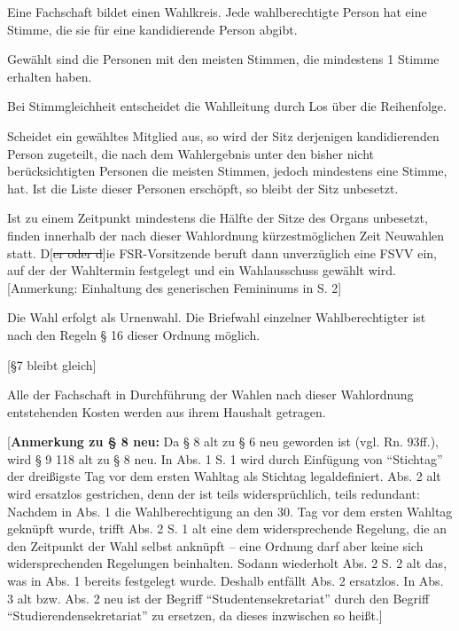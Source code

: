 \documentclass[%
draft,%
multilinesections%
]{fswo}
\newcommand\oldT[1] {{\color{Gray}[\st{#1}]}}
\newcommand\bemFr[1]{{\color{Red}[#1]}}
\newcommand\oldT[1]{}%
\newcommand\bemFr[1]{}%
\begin{document}
\begin{contract}
Eine Fachschaft bildet einen Wahlkreis.
Jede wahlberechtigte Person hat eine Stimme, die sie für eine kandidierende Person abgibt.

Gewählt sind die Personen mit den meisten Stimmen, die mindestens 1 Stimme erhalten haben.

Bei Stimmgleichheit entscheidet die Wahlleitung durch Los über die Reihenfolge.

Scheidet ein gewähltes Mitglied aus, so wird der Sitz derjenigen kandidierenden Person zugeteilt, die nach dem Wahlergebnis unter den bisher nicht berücksichtigten Personen die meisten Stimmen, jedoch mindestens eine Stimme, hat.
Ist die Liste dieser Personen erschöpft, so bleibt der Sitz unbesetzt.

Ist zu einem Zeitpunkt mindestens die Hälfte der Sitze des Organs unbesetzt, finden innerhalb der nach dieser Wahlordnung kürzestmöglichen Zeit Neuwahlen statt.
D\oldT{er oder d}ie FSR-Vorsitzende beruft dann unverzüglich eine FSVV ein, auf der der Wahltermin festgelegt und ein Wahlausschuss gewählt wird. \bemFr{Anmerkung: Einhaltung des generischen Femininums in S. 2}

Die Wahl erfolgt als Urnenwahl.
Die Briefwahl einzelner Wahlberechtigter ist nach den Regeln § 16 dieser Ordnung möglich.
\end{contract}

\bemFr{\S 7 bleibt gleich}
\begin{contract}
Alle der Fachschaft in Durchführung der Wahlen nach dieser Wahlordnung entstehenden Kosten werden aus ihrem Haushalt getragen.
\end{contract}

\bemFr{\textbf{Anmerkung zu § 8 neu:} Da § 8 alt zu § 6 neu geworden ist (vgl. Rn. 93ff.), wird § 9 118 alt zu § 8 neu. In Abs. 1 S. 1 wird durch Einfügung von \enquote{Stichtag} der dreißigste Tag vor dem ersten Wahltag als Stichtag legaldefiniert. Abs. 2 alt wird ersatzlos gestrichen, denn der ist teils widersprüchlich, teils redundant:
Nachdem in Abs. 1 die Wahlberechtigung an den 30. Tag vor dem ersten Wahltag geknüpft wurde, trifft Abs. 2 S. 1 alt eine dem widersprechende Regelung, die an den Zeitpunkt der Wahl selbst anknüpft -- eine Ordnung darf aber keine sich widersprechenden Regelungen beinhalten.
Sodann wiederholt Abs. 2 S. 2 alt das, was in Abs. 1 bereits festgelegt wurde.
Deshalb entfällt Abs. 2 ersatzlos. In Abs. 3 alt bzw. Abs. 2 neu ist der Begriff \enquote{Studentensekretariat} durch den Begriff \enquote{Studierendensekretariat} zu ersetzen, da dieses inzwischen so heißt.}
\end{document}
